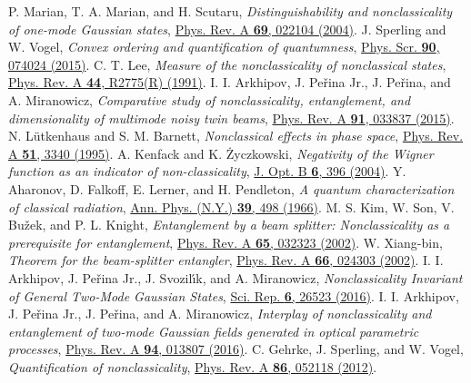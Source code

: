 \documentclass[aps,pra,twocolumn,showpacs,superscriptaddress,10pt]{revtex4-1}
\begin{document}
\begin{thebibliography}{100}
	 P. Marian, T. A. Marian, and H. Scutaru, {\it Distinguishability and nonclassicality of one-mode Gaussian states}, \href{http://link.aps.org/doi/10.1103/PhysRevA.69.022104}{Phys. Rev. A {\bf 69}, 022104 (2004)}.
	 J. Sperling and W. Vogel, {\it Convex ordering and quantification of quantumness}, \href{http://stacks.iop.org/1402-4896/90/i=7/a=074024}{Phys. Scr. {\bf 90}, 074024 (2015)}.
	 C. T. Lee, {\it Measure of the nonclassicality of nonclassical states}, \href{http://link.aps.org/doi/10.1103/PhysRevA.44.R2775}{Phys. Rev. A {\bf 44}, R2775(R) (1991)}.
	 I. I. Arkhipov, J. Pe\v{r}ina Jr., J. Pe\v{r}ina, and A. Miranowicz, {\it Comparative study of nonclassicality, entanglement, and dimensionality of multimode noisy twin beams}, \href{http://link.aps.org/doi/10.1103/PhysRevA.91.033837}{Phys. Rev. A {\bf 91}, 033837 (2015)}.
	 N. L\"utkenhaus and S. M. Barnett, {\it Nonclassical effects in phase space}, \href{http://link.aps.org/doi/10.1103/PhysRevA.51.3340}{Phys. Rev. A {\bf 51}, 3340 (1995)}.
	 A. Kenfack and K. \.{Z}yczkowski, {\it Negativity of the Wigner function as an indicator of non-classicality}, \href{http://stacks.iop.org/1464-4266/6/i=10/a=003}{J. Opt. B {\bf 6}, 396 (2004)}.
%	
	 Y. Aharonov, D. Falkoff, E. Lerner, and H. Pendleton, {\it A quantum characterization of classical radiation}, \href{http://dx.doi.org/10.1016/0003-4916(66)90079-0}{Ann. Phys. (N.Y.) {\bf 39}, 498 (1966)}.
	 M. S. Kim, W. Son, V. Bu\v{z}ek, and P. L. Knight, {\it Entanglement by a beam splitter: Nonclassicality as a prerequisite for entanglement}, \href{http://link.aps.org/doi/10.1103/PhysRevA.65.032323}{Phys. Rev. A {\bf 65}, 032323 (2002)}.
	 W. Xiang-bin, {\it Theorem for the beam-splitter entangler}, \href{http://link.aps.org/doi/10.1103/PhysRevA.66.024303}{Phys. Rev. A {\bf 66}, 024303 (2002)}.
	 I. I. Arkhipov, J. Pe\v{r}ina Jr., J. Svozil\'{\i}k, and A. Miranowicz, {\it Nonclassicality Invariant of General Two-Mode Gaussian States}, \href{http://dx.doi.org/10.1038/srep26523}{Sci. Rep. {\bf 6}, 26523 (2016)}.
	 I. I. Arkhipov, J. Pe\v{r}ina Jr., J. Pe\v{r}ina, and A. Miranowicz, {\it Interplay of nonclassicality and entanglement of two-mode Gaussian fields generated in optical parametric processes}, \href{http://link.aps.org/doi/10.1103/PhysRevA.94.013807}{Phys. Rev. A {\bf 94}, 013807 (2016)}.
%	
	 C. Gehrke, J. Sperling, and W. Vogel, {\it Quantification of nonclassicality}, \href{http://link.aps.org/doi/10.1103/PhysRevA.86.052118}{Phys. Rev. A {\bf 86}, 052118 (2012)}.

\end{thebibliography}
\end{document}
